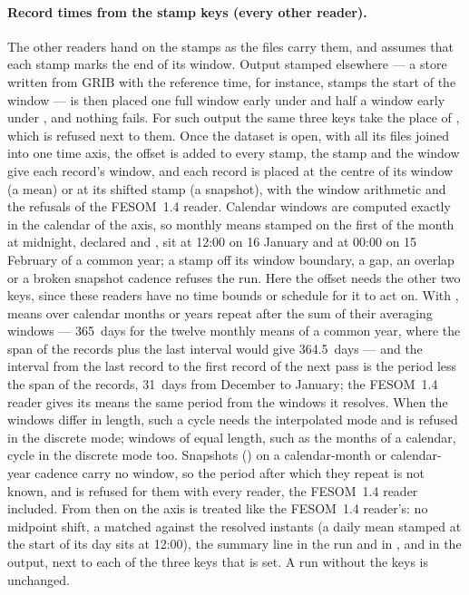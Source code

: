 \paragraph{Record times from the stamp keys (every other reader).} The other readers hand on the stamps as the
files carry them, and  assumes that each stamp marks the end of its window. Output
stamped elsewhere --- a store written from GRIB with the reference time, for instance, stamps the start of the
window --- is then placed one full window early under  and half a window early under
, and nothing fails. For such output the same three keys take the place of
, which is refused next to them. Once the dataset is open, with all its files joined into
one time axis, the offset is added to every stamp, the stamp and the window give each record's window, and each
record is placed at the centre of its window (a mean) or at its shifted stamp (a snapshot), with the window
arithmetic and the refusals of the FESOM~1.4 reader. Calendar windows are computed exactly in the calendar of
the axis, so monthly means stamped on the first of the month at midnight, declared  and
, sit at 12:00 on 16 January and at 00:00 on 15 February of a common year; a stamp off
its window boundary, a gap, an overlap or a broken snapshot cadence refuses the run. Here the offset needs the
other two keys, since these readers have no time bounds or schedule for it to act on. With
, means over calendar months or years repeat after the sum of their averaging
windows --- 365~days for the twelve monthly means of a common year, where the span of the records plus the last
interval would give 364.5~days --- and the interval from the last record to the first record of the next pass
is the period less the span of the records, 31~days from December to January; the FESOM~1.4 reader gives its
means the same period from the windows it resolves. When the windows differ in length, such a cycle needs the interpolated mode and is
refused in the discrete mode; windows of equal length, such as the months of a  calendar, cycle in
the discrete mode too. Snapshots () on a calendar-month or calendar-year cadence carry no window, so
the period after which they repeat is not known, and  is refused for them with every reader, the
FESOM~1.4 reader included. From then on the axis is treated like the FESOM~1.4 reader's: no midpoint
shift, a  matched against the resolved instants (a daily mean stamped at the start of its day
sits at 12:00), the summary line in the run and in , and
 in the output, next to each of the three keys that is set.
A run without the keys is unchanged.

